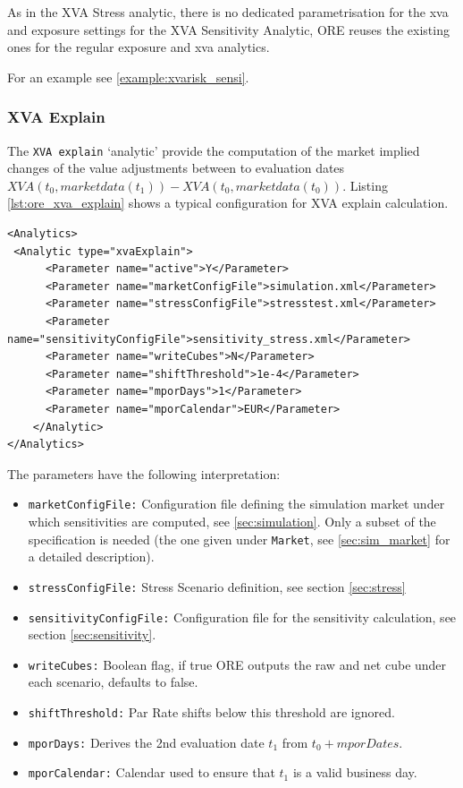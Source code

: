 As in the XVA Stress analytic, there is no dedicated parametrisation for the xva and exposure settings for the
XVA Sensitivity Analytic, ORE reuses the existing ones for the regular exposure and xva analytics.

For an example see \ref{example:xvarisk_sensi}.

\subsubsection{XVA Explain}

The {\tt XVA explain} `analytic' provide the computation of the market implied changes of the value adjustments
between to evaluation dates $XVA(t_0, marketdata(t_1)) - XVA(t_0, marketdata(t_0))$. Listing \ref{lst:ore_xva_explain}
shows a typical configuration for XVA explain calculation.

\begin{listing}[H]
\begin{verbatim}
<Analytics>
 <Analytic type="xvaExplain">
      <Parameter name="active">Y</Parameter>
      <Parameter name="marketConfigFile">simulation.xml</Parameter>
      <Parameter name="stressConfigFile">stresstest.xml</Parameter>
      <Parameter name="sensitivityConfigFile">sensitivity_stress.xml</Parameter>
      <Parameter name="writeCubes">N</Parameter>
      <Parameter name="shiftThreshold">1e-4</Parameter>
      <Parameter name="mporDays">1</Parameter>
      <Parameter name="mporCalendar">EUR</Parameter>
    </Analytic>
</Analytics>
\end{verbatim}
\caption{ORE analytic: XVA Explain}
\label{lst:ore_xva_explain}
\end{listing}

The parameters have the following interpretation:

\begin{itemize}
\item {\tt marketConfigFile:} Configuration file defining the simulation market under which sensitivities are computed,
  see \ref{sec:simulation}. Only a subset of the specification is needed (the one given under {\tt Market}, see
  \ref{sec:sim_market} for a detailed description).
  \item {\tt stressConfigFile:} Stress Scenario definition, see section \ref{sec:stress}
  \item {\tt sensitivityConfigFile:} Configuration file  for the sensitivity calculation, see section \ref{sec:sensitivity}.
  \item {\tt writeCubes:} Boolean flag, if true ORE outputs the raw and net cube under each scenario, defaults to false.
  \item {\tt shiftThreshold:} Par Rate shifts below this threshold are ignored.
  \item {\tt mporDays:} Derives the 2nd evaluation date $t_1$ from $t_0 + mporDates$.
  \item {\tt mporCalendar:} Calendar used to ensure that $t_1$ is a valid business day.
\end{itemize}

